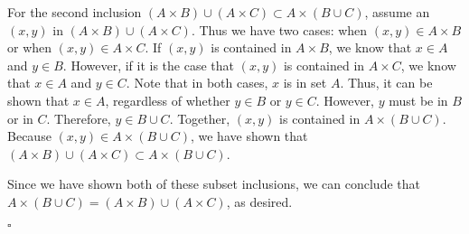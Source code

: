 \documentclass[12pt]{exam}
\begin{document}
\begin{questions}
For the second inclusion $(A \times B) \cup (A \times C) \subset A \times (B \cup C)$, assume an $(x, y)$ in $(A \times B) \cup (A \times C)$. Thus we have two cases: when $(x, y) \in A \times B$ or when $(x,y) \in A \times C$. If $(x, y)$ is contained in $A \times B$, we know that $x \in A$ and $y \in B$. However, if it is the case that $(x, y)$ is contained in $A \times C$, we know that $x \in A$ and $y \in C$. Note that in both cases, $x$ is in set $A$. Thus, it can be shown that $x \in A$, regardless of whether $y \in B$ or $y \in C$. However, $y$ must be in $B$ or in $C$. Therefore, $y \in B \cup C$. Together, $(x, y)$ is contained in $A \times (B \cup C)$. Because $(x, y) \in A \times (B \cup C)$, we have shown that $(A \times B) \cup (A \times C) \subset A \times (B \cup C)$.
\par
Since we have shown both of these subset inclusions, we can conclude that $A \times (B \cup C) = (A \times B) \cup (A \times C)$, as desired. 
\begin{flushright}
$\square$
\end{flushright}

\end{questions}
\end{document}
